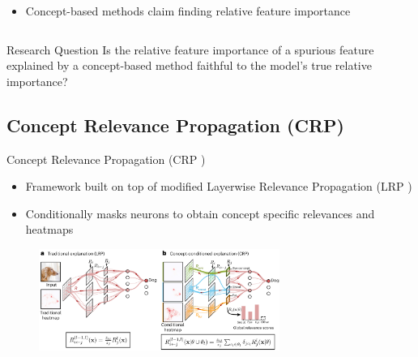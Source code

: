 \documentclass[German, aspectratio=169]{beamer}
\begin{document}
\begin{frame}[t]
\begin{columns}[t]
\begin{column}{0.6\textwidth}
\begin{itemize}
                      \pause
                \item Concept-based methods claim finding relative feature importance
            \end{itemize}
        \end{column}
    \end{columns}
    \pause
    \vspace{0.4cm}
    \begin{block}{Research Question}
        Is the relative feature importance of a spurious feature explained by a concept-based method faithful to the model's true relative importance?
    \end{block}
\end{frame}

\subsection{Concept Relevance Propagation (CRP)}
\begin{frame}[t]{Concept Relevance Propagation (CRP \cite{Achtibat2023})}
    \vspace{-0.5cm}
    \begin{itemize}
        \item Framework built on top of modified Layerwise Relevance Propagation (LRP \cite{Bach2015} )
        \item Conditionally masks neurons to obtain concept specific relevances and heatmaps
    \end{itemize}
    \vspace{-0.5cm}
    \begin{figure}
        \centering
        \includegraphics[width=0.7\textwidth]{images/crp_vs_lrp_from_paper.png}
    \end{figure}
    \vspace{-0.5cm}
\end{frame}
\end{document}
